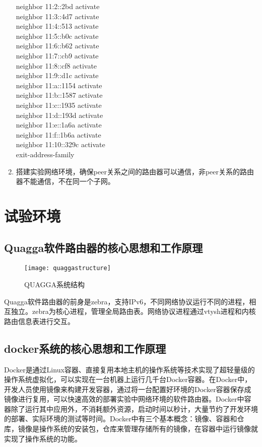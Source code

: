 \begin{enumerate}
     neighbor 11:2::2bd  activate\\
     neighbor 11:3::4d7  activate\\
     neighbor 11:4::513  activate\\
     neighbor 11:5::b0c  activate\\
     neighbor 11:6::b62  activate\\
     neighbor 11:7::cb9  activate\\
     neighbor 11:8::cf8  activate\\
     neighbor 11:9::d1c  activate\\
     neighbor 11:a::1154  activate\\
     neighbor 11:b::1587  activate\\
     neighbor 11:c::1935  activate\\
     neighbor 11:d::193d  activate\\
     neighbor 11:e::1a6a  activate\\
     neighbor 11:f::1b6a  activate\\
     neighbor 11:10::329c  activate\\
     exit-address-family
\item  搭建实验网络环境，确保peer关系之间的路由器可以通信，非peer关系的路由器不能通信，不在同一个子网。
\end{enumerate}

\section{试验环境}
\subsection{Quagga软件路由器的核心思想和工作原理}

\begin{figure}
  \centering
  \texttt{[image: quaggastructure]}\\
  \caption{QUAGGA系统结构}\label{fig:quaggastructure}
\end{figure}

Quagga\cite{quagga}软件路由器的前身是zebra，支持IPv6，不同网络协议运行不同的进程，相互独立。zebra为核心进程，管理全局路由表。网络协议进程通过vtysh进程和内核路由信息表进行交互。

\subsection{docker系统的核心思想和工作原理}
Docker\cite{docker}是通过Linux容器、直接复用本地主机的操作系统等技术实现了超轻量级的操作系统虚拟化，可以实现在一台机器上运行几千台Docker容器。在Docker中，开发人员使用镜像来构建开发容器，通过将一台配置好环境的Docker容器保存成镜像进行复用，可以快速高效的部署实验中网络环境的软件路由器。Docker中容器除了运行其中应用外，不消耗额外资源，启动时间以秒计，大量节约了开发环境的部署、实际环境的测试等时间。Docker中有三个基本概念：镜像、容器和仓库，镜像是操作系统的安装包，仓库来管理存储所有的镜像，在容器中运行镜像就实现了操作系统的功能。

